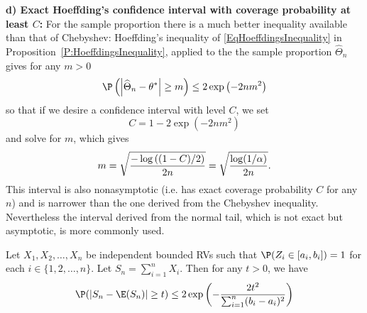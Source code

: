 \textbf{d) Exact Hoeffding's confidence interval with coverage probability at least $C$: } 
For the sample proportion there is a much better inequality available than that of Chebyshev: Hoeffding's inequality of \eqref{EqHoeffdingsInequality} in Proposition~\ref{P:HoeffdingsInequality}, 
applied to the the sample proportion $\widehat{\Theta}_{n}$ gives for any $%
m>0 $ 
\begin{equation*}
\P \left( \left\vert \widehat{\Theta}_{n}-\theta^*\right\vert \geq m\right) \leq 2\exp
\left( -2nm^{2}\right)
\end{equation*}%
so that if we desire a confidence interval with level $C$, we set 
\begin{equation*}
C=1-2\exp \left( -2nm^{2}\right)
\end{equation*}
and solve for $m$, which gives 
\begin{equation*}
m=\sqrt{\frac{-\log \left( (1-C)/2 \right)}{2n}}=\sqrt{\frac{\log (1/\alpha )}{%
2n}}.
\end{equation*}%
This interval is also nonasymptotic (i.e. has exact coverage probability $C$
for any $n$) and is narrower than the one derived from the Chebyshev
inequality. Nevertheless the interval derived from the normal tail, which is
not exact but asymptotic, is more commonly used.

\begin{prop}\label{P:HoeffdingsInequality}
Let $X_1,X_2,\ldots,X_n$ be independent bounded RVs such that $\P(Z_i \in [a_i,b_i])=1$ for each $i \in \{1,2,\ldots,n\}$. Let $S_n = \sum_{i=1}^n X_i$. Then for any $t>0$, we have
\begin{equation}\label{EqHoeffdingsInequality}
\P (\vert S_n - \E(S_n) \vert \geq t) \leq 2 \exp \left(-\frac{2t^2}{\sum_{i=1}^n (b_i-a_i)^2}\right)
\end{equation}
\end{prop}

